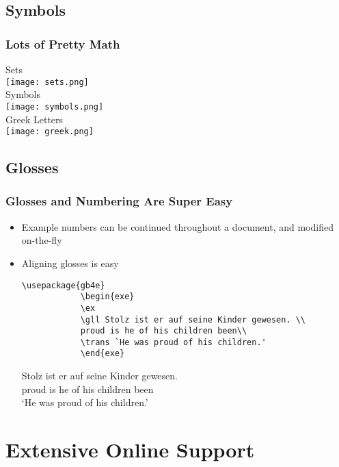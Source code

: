 \documentclass[xcolor={svgnames},
hyperref={colorlinks,citecolor=DeepPink4,linkcolor=DarkRed,urlcolor=DarkBlue}
]{beamer}
\begin{document}
	\subsection{Symbols}
	\begin{frame}
		\frametitle{Lots of Pretty Math}
		Sets \\
		\texttt{[image: sets.png]} \\
		Symbols \\
		\texttt{[image: symbols.png]} \\
		Greek Letters \\
		\texttt{[image: greek.png]}
	\end{frame}
	
	\subsection{Glosses}
	\begin{frame}[fragile]
		\frametitle{Glosses and Numbering Are Super Easy}
		\begin{itemize}
			\item Example numbers can be continued throughout a document, and modified on-the-fly
			\item Aligning glosses is easy
			\begin{Verbatim}[fontsize=\small]
			\usepackage{gb4e}
			\begin{exe}
			\ex
			\gll Stolz ist er auf seine Kinder gewesen. \\
			proud is he of his children been\\
			\trans `He was proud of his children.'
			\end{exe}
			\end{Verbatim}
			\begin{exe}
				\ex
				\gll Stolz ist er auf seine Kinder gewesen. \\
				proud is he of his children been\\
				\trans `He was proud of his children.'
			\end{exe}
		\end{itemize}
	\end{frame}
	
	\section{Extensive Online Support}
	
\end{document}
